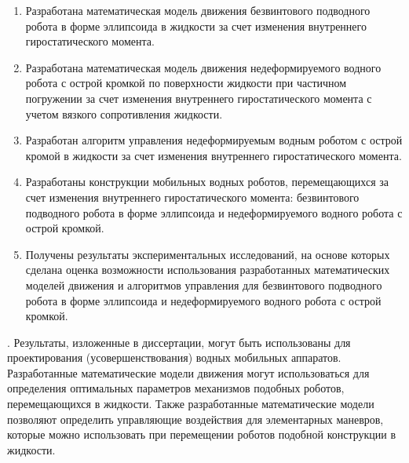 {\novelty}
\begin{enumerate}
  \item Разработана математическая модель движения безвинтового подводного робота в форме эллипсоида в жидкости за счет изменения внутреннего гиростатического момента.
  \item Разработана математическая модель движения недеформируемого водного робота с острой кромкой по поверхности жидкости при частичном погружении за счет изменения внутреннего гиростатического момента с учетом вязкого сопротивления жидкости.
  \item Разработан алгоритм управления недеформируемым водным роботом с острой кромой в жидкости за счет изменения внутреннего гиростатического момента.
  \item Разработаны конструкции мобильных водных роботов, перемещающихся за счет изменения внутреннего гиростатического момента: безвинтового подводного робота в форме эллипсоида и недеформируемого водного робота с острой кромкой.
  \item Получены результаты экспериментальных исследований, на основе которых сделана оценка возможности использования разработанных математических моделей движения и алгоритмов управления для безвинтового подводного робота в форме эллипсоида и недеформируемого водного робота с острой кромкой.
\end{enumerate}

{\influence}. Результаты, изложенные в диссертации, могут быть использованы для проектирования (усовершенствования) водных мобильных аппаратов. Разработанные математические модели движения могут использоваться для определения оптимальных параметров механизмов подобных роботов, перемещающихся в жидкости. Также разработанные математические модели позволяют определить управляющие воздействия для элементарных маневров, которые можно использовать при перемещении роботов подобной конструкции в жидкости.


